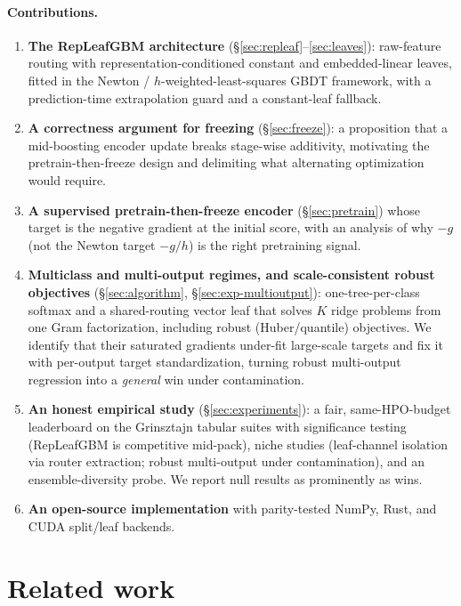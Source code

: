\documentclass[11pt]{article}
\begin{document}
\paragraph{Contributions.}
\begin{enumerate}
\item \textbf{The RepLeafGBM architecture} (\S\ref{sec:repleaf}--\ref{sec:leaves}):
  raw-feature routing with representation-conditioned constant and embedded-linear
  leaves, fitted in the Newton / $h$-weighted-least-squares GBDT framework, with a
  prediction-time extrapolation guard and a constant-leaf fallback.
\item \textbf{A correctness argument for freezing} (\S\ref{sec:freeze}): a proposition
  that a mid-boosting encoder update breaks stage-wise additivity, motivating the
  pretrain-then-freeze design and delimiting what alternating optimization would
  require.
\item \textbf{A supervised pretrain-then-freeze encoder} (\S\ref{sec:pretrain}) whose
  target is the negative gradient at the initial score, with an analysis of why $-g$
  (not the Newton target $-g/h$) is the right pretraining signal.
\item \textbf{Multiclass and multi-output regimes, and scale-consistent robust objectives}
  (\S\ref{sec:algorithm}, \S\ref{sec:exp-multioutput}): one-tree-per-class softmax and a
  shared-routing vector leaf that solves $K$ ridge problems from one Gram factorization,
  including robust (Huber/quantile) objectives. We identify that their saturated gradients
  under-fit large-scale targets and fix it with per-output target standardization, turning
  robust multi-output regression into a \emph{general} win under contamination.
\item \textbf{An honest empirical study} (\S\ref{sec:experiments}): a fair,
  same-HPO-budget leaderboard on the Grinsztajn tabular suites with significance testing
  (RepLeafGBM is competitive mid-pack), niche studies (leaf-channel isolation via router
  extraction; robust multi-output under contamination), and an ensemble-diversity probe. We
  report null results as prominently as wins.
\item \textbf{An open-source implementation} with parity-tested NumPy, Rust, and CUDA
  split/leaf backends.
\end{enumerate}

\section{Related work}
\label{sec:related}
\end{document}
